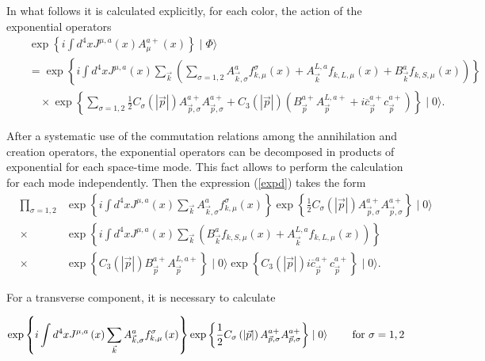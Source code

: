 \documentclass[12pt,letterpaper]{report}
\begin{document}
In what follows it is calculated explicitly, for each color, the
action of the exponential operators
\begin{eqnarray}
&&\exp \left\{ i\int d^4xJ^{\mu,a}\left(x\right) A_\mu ^{a+}\left(
x\right) \right\} \mid \Phi \rangle \nonumber \\ &&=\exp \left\{
i\int d^4xJ^{\mu,a}\left(x\right) \sum\limits_{\vec{k} }\left(
\sum\limits_{\sigma =1,2}A_{\vec{k},\sigma }^af_{k,\mu }^\sigma
\left(x\right) +A_{\vec{k}}^{L,a}f_{k,L,\mu }\left(x\right)
+B_{\vec{k} }^af_{k,S,\mu }\left(x\right) \right) \right\}
\nonumber \\ &&\quad\times \exp \left\{ \sum\limits_{\sigma
=1,2}\frac 12C_\sigma \left(\left| \vec{p}\right| \right)
A_{\vec{p},\sigma }^{a+}A_{\vec{p},\sigma }^{a+}+C_3\left(\left|
\vec{p}\right| \right) \left(B_{\vec{p}}^{a+}A_{
\vec{p}}^{L,a+}+i\overline{c}_{\vec{p}}^{a+}c_{\vec{p}}^{a+}\right)
\right\} \mid 0\rangle. \label{expd}
\end{eqnarray}

After a systematic use of the commutation relations among the
annihilation and creation operators, the exponential operators can
be decomposed in products of exponential for each space-time mode.
This fact allows to perform the calculation for each mode
independently. Then the expression (\ref {expd}) takes the form
{\setlength\arraycolsep{0.2pt}
\begin{eqnarray}
&\prod\limits_{\sigma =1,2}&\exp \left\{ i\int d^4xJ^{\mu
,a}\left(x\right) \sum\limits_{\vec{k}}A_{\vec{k},\sigma
}^af_{k,\mu }^\sigma \left(x\right) \right\} \exp \left\{ \frac
12C_\sigma \left(\left| \vec{p}\right| \right) A_{\vec{p},\sigma
}^{a+}A_{\vec{p},\sigma }^{a+}\right\} \mid 0\rangle \nonumber \\
&\times &\exp \left\{ i\int d^4xJ^{\mu,a}\left(x\right)
\sum\limits_{\vec{k }}\left(B_{\vec{k}}^af_{k,S,\mu }\left(
x\right)+A_{\vec{k} }^{L,a}f_{k,L,\mu }\left(x\right)\right)
\right\} \nonumber \\ &\times &\exp \left\{ C_3\left(\left|
\vec{p}\right| \right) B_{\vec{p} }^{a+}A_{\vec{p}}^{L,a+}\right\}
\mid 0\rangle \exp \left\{ C_3\left(\left| \vec{p}\right| \right)
i\overline{c}_{\vec{p}}^{a+}c_{\vec{p}}^{a+}\right\} \mid
0\rangle.
\end{eqnarray}}

For a transverse component, it is necessary to calculate

\begin{equation}
\exp \left\{ i\int d^4xJ^{\mu,a}\left(x\right)
\sum\limits_{\vec{k}}A_{ \vec{k},\sigma }^af_{k,\mu }^\sigma
\left(x\right) \right\} \exp \left\{ \frac 12C_\sigma \left(
\left| \vec{p}\right| \right) A_{\vec{p},\sigma
}^{a+}A_{\vec{p},\sigma }^{a+}\right\} \mid 0\rangle \
\text{\qquad for } \sigma =1,2 \label{modT}
\end{equation}
\end{document}
